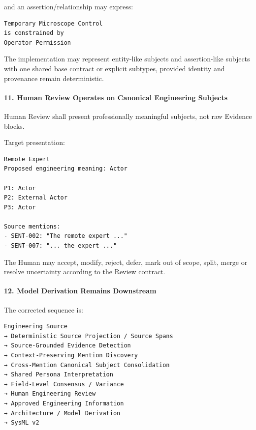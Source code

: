 and an assertion/relationship may express:

\begin{verbatim}
Temporary Microscope Control
is constrained by
Operator Permission
\end{verbatim}

The implementation may represent entity-like subjects and assertion-like subjects with one shared base contract or explicit subtypes, provided identity and provenance remain deterministic.

\hypertarget{11-human-review-operates-on-canonical-engineering-subjects}{%
\paragraph{11. Human Review Operates on Canonical Engineering Subjects}\label{11-human-review-operates-on-canonical-engineering-subjects}}

Human Review shall present professionally meaningful subjects, not raw Evidence blocks.

Target presentation:

\begin{verbatim}
Remote Expert
Proposed engineering meaning: Actor

P1: Actor
P2: External Actor
P3: Actor

Source mentions:
- SENT-002: "The remote expert ..."
- SENT-007: "... the expert ..."
\end{verbatim}

The Human may accept, modify, reject, defer, mark out of scope, split, merge or resolve uncertainty according to the Review contract.

\hypertarget{12-model-derivation-remains-downstream}{%
\paragraph{12. Model Derivation Remains Downstream}\label{12-model-derivation-remains-downstream}}

The corrected sequence is:

\begin{verbatim}
Engineering Source
→ Deterministic Source Projection / Source Spans
→ Source-Grounded Evidence Detection
→ Context-Preserving Mention Discovery
→ Cross-Mention Canonical Subject Consolidation
→ Shared Persona Interpretation
→ Field-Level Consensus / Variance
→ Human Engineering Review
→ Approved Engineering Information
→ Architecture / Model Derivation
→ SysML v2
\end{verbatim}

